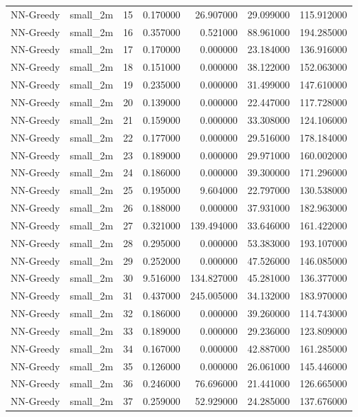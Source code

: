 \begin{tabular}{llrrrrr}
NN-Greedy & small_2m & 15 & 0.170000 & 26.907000 & 29.099000 & 115.912000 \\
NN-Greedy & small_2m & 16 & 0.357000 & 0.521000 & 88.961000 & 194.285000 \\
NN-Greedy & small_2m & 17 & 0.170000 & 0.000000 & 23.184000 & 136.916000 \\
NN-Greedy & small_2m & 18 & 0.151000 & 0.000000 & 38.122000 & 152.063000 \\
NN-Greedy & small_2m & 19 & 0.235000 & 0.000000 & 31.499000 & 147.610000 \\
NN-Greedy & small_2m & 20 & 0.139000 & 0.000000 & 22.447000 & 117.728000 \\
NN-Greedy & small_2m & 21 & 0.159000 & 0.000000 & 33.308000 & 124.106000 \\
NN-Greedy & small_2m & 22 & 0.177000 & 0.000000 & 29.516000 & 178.184000 \\
NN-Greedy & small_2m & 23 & 0.189000 & 0.000000 & 29.971000 & 160.002000 \\
NN-Greedy & small_2m & 24 & 0.186000 & 0.000000 & 39.300000 & 171.296000 \\
NN-Greedy & small_2m & 25 & 0.195000 & 9.604000 & 22.797000 & 130.538000 \\
NN-Greedy & small_2m & 26 & 0.188000 & 0.000000 & 37.931000 & 182.963000 \\
NN-Greedy & small_2m & 27 & 0.321000 & 139.494000 & 33.646000 & 161.422000 \\
NN-Greedy & small_2m & 28 & 0.295000 & 0.000000 & 53.383000 & 193.107000 \\
NN-Greedy & small_2m & 29 & 0.252000 & 0.000000 & 47.526000 & 146.085000 \\
NN-Greedy & small_2m & 30 & 9.516000 & 134.827000 & 45.281000 & 136.377000 \\
NN-Greedy & small_2m & 31 & 0.437000 & 245.005000 & 34.132000 & 183.970000 \\
NN-Greedy & small_2m & 32 & 0.186000 & 0.000000 & 39.260000 & 114.743000 \\
NN-Greedy & small_2m & 33 & 0.189000 & 0.000000 & 29.236000 & 123.809000 \\
NN-Greedy & small_2m & 34 & 0.167000 & 0.000000 & 42.887000 & 161.285000 \\
NN-Greedy & small_2m & 35 & 0.126000 & 0.000000 & 26.061000 & 145.446000 \\
NN-Greedy & small_2m & 36 & 0.246000 & 76.696000 & 21.441000 & 126.665000 \\
NN-Greedy & small_2m & 37 & 0.259000 & 52.929000 & 24.285000 & 137.676000 \\

\end{tabular}
